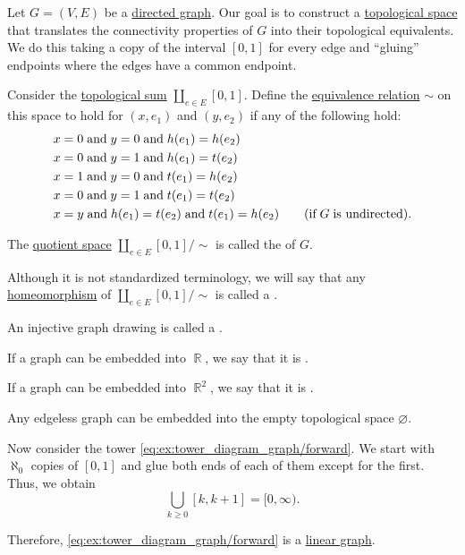 \begin{definition}\label{def:graph_geometric_realization}
  Let \( G = (V, E) \) be a \hyperref[def:graph/directed]{directed graph}. Our goal is to construct a \hyperref[def:topological_space]{topological space} that translates the connectivity properties of \( G \) into their topological equivalents. We do this taking a copy of the interval \( [0, 1] \) for every edge and \enquote{gluing} endpoints where the edges have a common endpoint.

  Consider the \hyperref[def:topological_sum]{topological sum} \( \coprod_{e \in E} [0, 1] \). Define the \hyperref[def:equivalence_relation]{equivalence relation} \( {\sim} \) on this space to hold for \( (x, e_1) \) and \( (y, e_2) \) if any of the following hold:
  \begin{align*}
    &x = 0 \T{and} y = 0 \T{and} h(e_1) = h(e_2) \\
    &x = 0 \T{and} y = 1 \T{and} h(e_1) = t(e_2) \\
    &x = 1 \T{and} y = 0 \T{and} t(e_1) = h(e_2) \\
    &x = 0 \T{and} y = 1 \T{and} t(e_1) = t(e_2) \\
    &x = y \T{and} h(e_1) = t(e_2) \T{and} t(e_1) = h(e_2) \quad\quad (\T{if} G \T{is undirected}).
  \end{align*}

  The \hyperref[def:topological_quotient]{quotient space} \( \coprod_{e \in E} [0, 1] / {\sim} \) is called the  of \( G \).

  \begin{thmenum}
     Although it is not standardized terminology, we will say that any \hyperref[def:homeomorphism]{homeomorphism} of \( \coprod_{e \in E} [0, 1] / {\sim} \) is called a .

     An injective graph drawing is called a .

     If a graph can be embedded into \( \BbbR \), we say that it is .

     If a graph can be embedded into \( \BbbR^2 \), we say that it is .
  \end{thmenum}
\end{definition}

\begin{example}\label{ex:def:graph_geometric_realization}
  Any edgeless graph can be embedded into the empty topological space \( \varnothing \).

  Now consider the tower \eqref{eq:ex:tower_diagram_graph/forward}. We start with \( \aleph_0 \) copies of \( [0, 1] \) and glue both ends of each of them except for the first. Thus, we obtain
  \begin{equation*}
    \bigcup_{k \geq 0} [k, k + 1] = [0, \infty).
  \end{equation*}

  Therefore, \eqref{eq:ex:tower_diagram_graph/forward} is a \hyperref[def:graph_geometric_realization/linear]{linear graph}.
\end{example}
